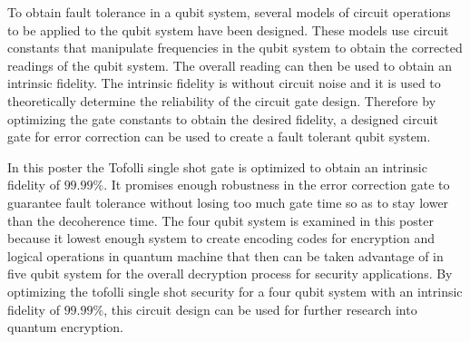 To obtain fault tolerance in a qubit system, several models of circuit operations to be applied to the qubit system have been designed. These models use circuit constants that manipulate frequencies in the qubit system to obtain the corrected readings of the qubit system. The overall reading can then be used to obtain an intrinsic fidelity. The intrinsic fidelity is without circuit noise and it is used to theoretically determine the reliability of the circuit gate design. Therefore by optimizing the gate constants to obtain the desired fidelity, a designed circuit gate for error correction can be used to create a fault tolerant qubit system. 

In this poster the Tofolli single shot gate is optimized to obtain an intrinsic fidelity of $99.99\%$. It promises enough robustness in the error correction gate to guarantee fault tolerance without losing too much gate time so as to stay lower than the decoherence time. The four qubit system is examined in this poster because it lowest enough system to create encoding codes for encryption and logical operations in quantum machine that then can be taken advantage of in five qubit system for the overall decryption process for security applications. By optimizing the tofolli single shot security for a four qubit system with an intrinsic fidelity of $99.99\%$, this circuit design can be used for further research into quantum encryption.              

